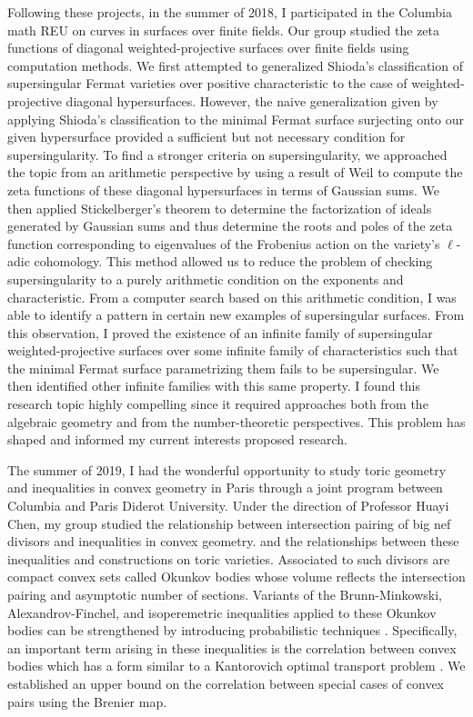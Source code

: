 \documentclass[11pt]{amsart}
\begin{document}
\par 
Following these projects, in the summer of 2018, I participated in the Columbia math REU on curves in surfaces over finite fields. Our group studied the zeta functions of diagonal weighted-projective surfaces over finite fields using computation methods. We first attempted to generalized Shioda’s classification of supersingular Fermat varieties over positive characteristic to the case of weighted-projective diagonal hypersurfaces. However, the naive generalization given by applying Shioda’s classification to the minimal Fermat surface surjecting onto our given hypersurface provided a sufficient but not necessary condition for supersingularity. To find a stronger criteria on supersingularity, we approached the topic from an arithmetic perspective by using a result of Weil to compute the zeta functions of these diagonal hypersurfaces in terms of Gaussian sums. We then applied Stickelberger's theorem to determine the factorization of ideals generated by Gaussian sums and thus determine the roots and poles of the zeta function corresponding to eigenvalues of the Frobenius action on the variety’s $\ell$-adic cohomology. This method allowed us to reduce the problem of checking supersingularity to a purely arithmetic condition on the exponents and characteristic. 
From a computer search based on this arithmetic condition, I was able to identify a pattern in certain new examples of supersingular surfaces. From this observation, I proved the existence of an infinite family of supersingular weighted-projective surfaces over some infinite family of characteristics such that the minimal Fermat surface parametrizing them fails to be supersingular. We then identified other infinite families with this same property. I found this research topic highly compelling since it required approaches both from the algebraic geometry and from the number-theoretic perspectives. This problem has shaped and informed my current interests proposed research.
\par
The summer of 2019, I had the wonderful opportunity to study toric geometry and inequalities in convex geometry in Paris through a joint program between Columbia and Paris Diderot University. Under the direction of Professor Huayi Chen, my group studied the relationship between intersection pairing of big nef divisors and inequalities in convex geometry. and the relationships between these inequalities and constructions on toric varieties. Associated to such divisors are compact convex sets called Okunkov bodies whose volume reflects the intersection pairing and asymptotic number of sections. Variants of the Brunn-Minkowski, Alexandrov-Finchel, and isoperemetric inequalities applied to these Okunkov bodies can be strengthened by introducing probabilistic techniques \cite{probabiliste}. Specifically, an important term arising in these inequalities is the correlation between convex bodies which has a form similar to a Kantorovich optimal transport problem  \cite{isoperimetric}. We established an upper bound on the correlation between special cases of convex pairs using the Brenier map.
\end{document}
